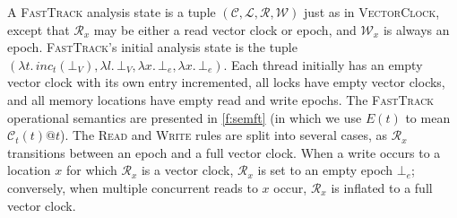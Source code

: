 \documentclass[preprint, 10pt]{sigplanconf}
\newcommand{\VCalg}{\textsc{VectorClock}\xspace}
\newcommand{\FT}{\textsc{FastTrack}\xspace}
\newcommand{\Rule}[1]{\textsc{#1}}
\begin{document}
A \FT analysis state is a tuple $(\mathcal{C}, \mathcal{L}, \mathcal{R}, \mathcal{W})$ just as in \VCalg, except that $\mathcal{R}_x$ may be either a read vector clock or epoch, and $\mathcal{W}_x$ is always an epoch. \FT's initial analysis state is the tuple $(\lambda t.\,\mathit{inc}_t(\bot_V), \lambda l.\,\bot_V , \lambda x.\, \bot_e, \lambda x.\, \bot_e)$. Each thread initially has an empty vector clock with its own entry incremented, all locks have empty vector clocks, and all memory locations have empty read and write epochs. The \FT operational semantics are presented in \autoref{f:semft} (in which we use $E(t)$ to mean $\mathcal{C}_t(t)@t$). The \Rule{Read} and \Rule{Write} rules are split into several cases, as $\mathcal{R}_x$ transitions between an epoch and a full vector clock. When a write occurs to a location $x$ for which $\mathcal{R}_x$ is a vector clock, $\mathcal{R}_x$ is set to an empty epoch $\bot_e$; conversely, when multiple concurrent reads to $x$ occur, $\mathcal{R}_x$ is inflated to a full vector clock.
\end{document}
